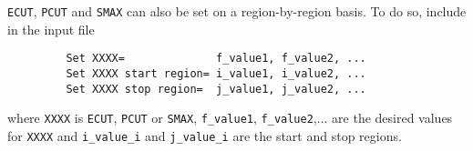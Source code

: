 \verb+ECUT+, \verb+PCUT+ and \verb+SMAX+ can also be set on a
region-by-region basis. To do so, include in the input file
\begin{verbatim}
         Set XXXX=              f_value1, f_value2, ...
         Set XXXX start region= i_value1, i_value2, ...
         Set XXXX stop region=  j_value1, j_value2, ...
\end{verbatim}
where \verb+XXXX+ is \verb+ECUT+, \verb+PCUT+ or \verb+SMAX+,
\verb+f_value1+, \verb+f_value2+,...
are the desired values for \verb+XXXX+ and \verb+i_value_i+ and
\verb+j_value_i+ are the start and stop regions.
